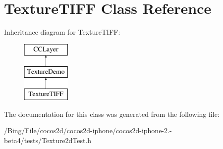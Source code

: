 \hypertarget{interface_texture_t_i_f_f}{\section{Texture\-T\-I\-F\-F Class Reference}
\label{interface_texture_t_i_f_f}
}
Inheritance diagram for Texture\-T\-I\-F\-F\-:\begin{figure}[H]
\begin{center}
\leavevmode
\includegraphics[height=3.000000cm]{interface_texture_t_i_f_f}
\end{center}
\end{figure}


The documentation for this class was generated from the following file\-:\begin{DoxyCompactItemize}
\item 
/\-Bing/\-File/cocos2d/cocos2d-\/iphone/cocos2d-\/iphone-\/2.-\/beta4/tests/Texture2d\-Test.\-h\end{DoxyCompactItemize}
